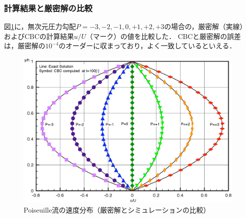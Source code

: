 %
\subsubsection{計算結果と厳密解の比較}

図\ref{Fig.poi_exact_100}に，無次元圧力勾配$P=-3, -2, -1, 0, +1, +2, +3$の場合の，厳密解（実線）およびCBCの計算結果$u/U$（マーク）の値を比較した．
CBCと厳密解の誤差は，厳密解の$10^{-4}$のオーダーに収まっており，よく一致しているといえる．


\begin{figure}[htbp]
\begin{center}
\includegraphics[width=14cm]{2Dpoiseuille_100.eps}
\end{center}
\caption{Poiseuille流の速度分布（厳密解とシミュレーションの比較）}
\label{Fig.poi_exact_100}
\end{figure}

%
